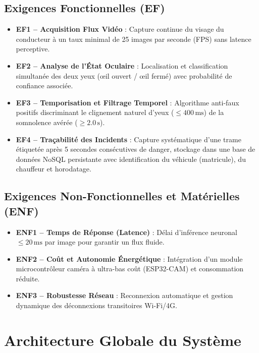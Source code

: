 \documentclass[11pt,a4paper]{article}
\begin{document}
\subsection{Exigences Fonctionnelles (EF)}
\begin{itemize}
    \item \textbf{EF1 -- Acquisition Flux Vidéo} : Capture continue du visage du conducteur à un taux minimal de 25 images par seconde (FPS) sans latence perceptive.
    \item \textbf{EF2 -- Analyse de l'État Oculaire} : Localisation et classification simultanée des deux yeux (œil ouvert / œil fermé) avec probabilité de confiance associée.
    \item \textbf{EF3 -- Temporisation et Filtrage Temporel} : Algorithme anti-faux positifs discriminant le clignement naturel d'yeux ($\le 400\,\text{ms}$) de la somnolence avérée ($\ge 2.0\,\text{s}$).
    \item \textbf{EF4 -- Traçabilité des Incidents} : Capture systématique d'une trame étiquetée après 5 secondes consécutives de danger, stockage dans une base de données NoSQL persistante avec identification du véhicule (matricule), du chauffeur et horodatage.
\end{itemize}

\subsection{Exigences Non-Fonctionnelles et Matérielles (ENF)}
\begin{itemize}
    \item \textbf{ENF1 -- Temps de Réponse (Latence)} : Délai d'inférence neuronal $\le 20\,\text{ms}$ par image pour garantir un flux fluide.
    \item \textbf{ENF2 -- Coût et Autonomie Énergétique} : Intégration d'un module microcontrôleur caméra à ultra-bas coût (ESP32-CAM) et consommation réduite.
    \item \textbf{ENF3 -- Robustesse Réseau} : Reconnexion automatique et gestion dynamique des déconnexions transitoires Wi-Fi/4G.
\end{itemize}

\section{Architecture Globale du Système}
\end{document}
